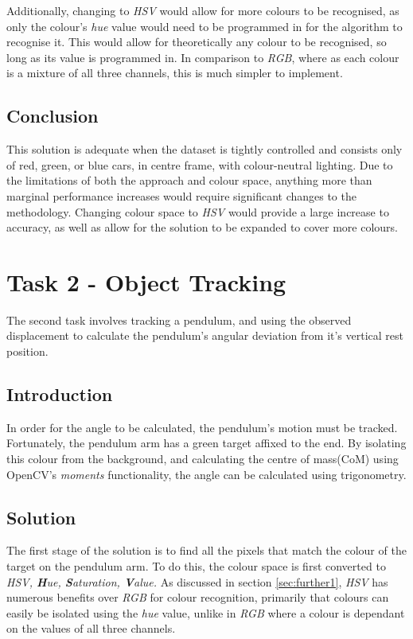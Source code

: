\documentclass[conference]{IEEEtran}
\begin{document}
Additionally, changing to \textit{HSV} would allow for more colours to be recognised, as only the colour's \textit{hue} value would need to be programmed in for the algorithm to recognise it. This would allow for theoretically any colour to be recognised, so long as its value is programmed in. In comparison to \textit{RGB}, where as each colour is a mixture of all three channels, this is much simpler to implement.
\subsection{Conclusion}
This solution is adequate when the dataset is tightly controlled and consists only of red, green, or blue cars, in centre frame, with colour-neutral lighting. Due to the limitations of both the approach and colour space, anything more than marginal performance increases would require significant changes to the methodology. Changing colour space to \textit{HSV} would provide a large increase to accuracy, as well as allow for the solution to be expanded to cover more colours.

\section{Task 2 - Object Tracking}
The second task involves tracking a pendulum, and using the observed displacement to calculate the pendulum's angular deviation from it's vertical rest position.
\subsection{Introduction}
In order for the angle to be calculated, the pendulum's motion must be tracked. Fortunately, the pendulum arm has a green target affixed to the end. By isolating this colour from the background, and calculating the centre of mass(CoM) using OpenCV's \textit{moments} functionality, the angle can be calculated using trigonometry.
\subsection{Solution}
The first stage of the solution is to find all the pixels that match the colour of the target on the pendulum arm. To do this, the colour space is first converted to \textit{HSV, \textbf{H}ue, \textbf{S}aturation, \textbf{V}alue.} As discussed in section \ref{sec:further1}, \textit{HSV} has numerous benefits over \textit{RGB} for colour recognition, primarily that colours can easily be isolated using the \textit{hue} value, unlike in \textit{RGB} where a colour is dependant on the values of all three channels.
\end{document}
